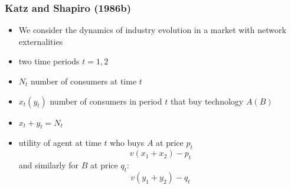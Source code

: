 \documentclass[11pt,english]{beamer}
\begin{document}
\begin{frame}[allowframebreaks]\frametitle{Katz and Shapiro (1986b)}
\label{sec-6-1}
\begin{itemize}

\item We consider the dynamics of industry evolution in a market with network externalities\\
\label{sec-6-1-1}%
\item two time periods $t=1,2$\\
\label{sec-6-1-2}%
\item $N_{t}$ number of consumers at time $t$\\
\label{sec-6-1-3}%
\item $x_{t}(y_{t})$ number of consumers in period $t$ that buy technology $A(B)$\\
\label{sec-6-1-4}%
\item $x_{t}+y_{t}=N_{t}$\\
\label{sec-6-1-5}%
\item utility of agent at time $t$ who buys $A$ at price $p_{t}$
\label{sec-6-1-6}%
\begin{equation*}
v(x_1+x_2)-p_t
\end{equation*}
and similarly for $B$ at price $q_t$:
\begin{equation*}
v(y_1+y_2)-q_t
\end{equation*}


\end{itemize}
\end{frame}
\end{document}
